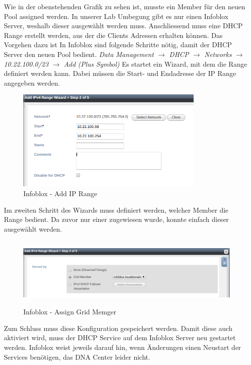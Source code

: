 Wie in der obenstehenden Grafik zu sehen ist, musste ein Member für den neuen Pool assigned werden. In unserer Lab Umbegung gibt es nur einen Infoblox Server, weshalb dieser ausgewählt werden muss.
Anschliessend muss eine DHCP Range erstellt werden, aus der die Clients Adressen erhalten können. Das Vorgehen dazu ist 
In Infoblox sind folgende Schritte nötig, damit der DHCP Server den neuen Pool bedient. \textit{Data Management $\rightarrow$ DHCP  $\rightarrow$ Networks $\rightarrow$ 10.22.100.0/23 $\rightarrow$ Add (Plus Symbol)}
Es startet ein Wizard, mit dem die Range definiert werden kann. Dabei müssen die Start- und Endadresse der IP Range angegeben werden.

\begin{figure}[H]
	\centering
	\includegraphics[height=5cm]{img/secondtry/infoblox-add-dhcp-2.png}
	\caption{Infoblox - Add IP Range}
	\label{fig:infoblox-add-ip-range}
\end{figure}

Im zweiten Schritt des Wizards muss definiert werden, welcher Member die Range bedient. Da zuvor nur einer zugewiesen wurde, konnte einfach dieser ausgewählt werden.

\begin{figure}[H]
	\centering
	\includegraphics[height=3.5cm]{img/secondtry/infoblox-add-dhcp-3.png}
	\caption{Infoblox - Assign Grid Memger}
	\label{fig:infoblox-assign-grid-member}
\end{figure}

Zum Schluss muss diese Konfiguration gespeichert werden. Damit diese auch aktiviert wird, muss der DHCP Service auf dem Infoblox Server neu gestartet werden. Infoblox weist jeweils darauf hin, wenn Änderungen einen Neustart der Services benötigen, das DNA Center leider nicht.

